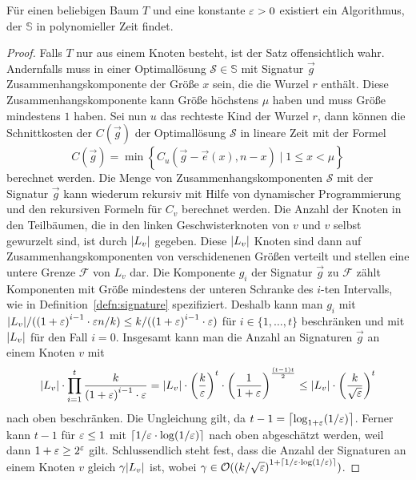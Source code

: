 \begin{thm}\label{thm:treealg}
    Für einen beliebigen Baum $T$ und eine konstante $\eps > 0$ existiert ein Algorithmus, der $\mathbb{S}$ in polynomieller Zeit findet.
\end{thm}
\begin{proof}
    Falls $T$ nur aus einem Knoten besteht, ist der Satz offensichtlich wahr.
    Andernfalls muss in einer Optimallösung $\mathcal{S} \in \mathbb{S}$ mit Signatur $\vec{g}$ Zusammenhangskomponente der Größe $x$ sein, die die Wurzel $r$ enthält.
    Diese Zusammenhangskomponente kann Größe höchstens $\mu$ haben und muss Größe mindestens $1$ haben.
    Sei nun $u$ das rechteste Kind der Wurzel $r$, dann können die Schnittkosten der $C(\vec{g})$ der Optimallösung $\mathcal{S}$ in lineare Zeit mit der Formel
    \begin{equation} \label{eq:root}
        C(\vec{g}) = \min \left\{ C_u(\vec{g} - \vec{e}(x), n - x) \mid 1 \leq x < \mu \right\}
    \end{equation}
    berechnet werden.
    Die Menge von Zusammenhangskomponenten $\mathcal{S}$ mit der Signatur $\vec{g}$ kann wiederum rekursiv mit Hilfe von dynamischer Programmierung und den rekursiven Formeln für $C_v$ berechnet werden.
    Die Anzahl der Knoten in den Teilbäumen, die in den linken Geschwisterknoten von $v$ und $v$ selbst gewurzelt sind, ist durch $\card{L_v}$ gegeben.
    Diese $\card{L_v}$ Knoten sind dann auf Zusammenhangskomponenten von verschidenenen Größen verteilt und stellen eine untere Grenze $\mathcal{F}$ von $L_v$ dar.
    Die Komponente $g_i$ der Signatur $\vec{g}$ zu $\mathcal{F}$ zählt Komponenten mit Größe mindestens der unteren Schranke des $i$-ten Intervalls, wie in Definition~\ref{defn:signature} spezifiziert.
    Deshalb kann man $g_i$ mit $\card{L_v}/({(1 + \eps)}^{i - 1} \cdot \eps n/k) \leq k/({(1 + \eps)}^{i - 1} \cdot \eps)$ für $i \in \{1, \ldots, t\}$ beschränken und mit $\card{L_v}$ für den Fall $i = 0$.
    Insgesamt kann man die Anzahl an Signaturen $\vec{g}$ an einem Knoten $v$ mit
    \begin{equation*}
        \card{L_v} \cdot \prod^t_{i=1} \frac{k}{{(1 + \eps)}^{i - 1} \cdot \eps} 
        = \card{L_v} \cdot {\left( \frac{k}{\eps} \right)}^t \cdot {\left( \frac{1}{1 + \eps} \right)}^{\frac{(t-1)t}{2}} 
        \leq \card{L_v} \cdot {\left( \frac{k}{\sqrt{\eps}} \right)}^t
    \end{equation*}
    nach oben beschränken. 
    Die Ungleichung gilt, da $t - 1 = \ceil*{\log_{1 + \eps}(1/\eps)}$. 
    Ferner kann $t - 1$ für $\eps \leq 1$ mit $\ceil*{1/\eps \cdot \log(1/\eps)}$ nach oben abgeschätzt werden, weil dann $1 + \eps \geq 2^\eps$ gilt.
    Schlussendlich steht fest, dass die Anzahl der Signaturen an einem Knoten $v$ gleich $\gamma \card{L_v}$ ist, wobei $\gamma \in \bigO({(k/\sqrt{\eps})}^{1 + \ceil{1/\eps \cdot \log(1/\eps)}})$.


\end{proof}
